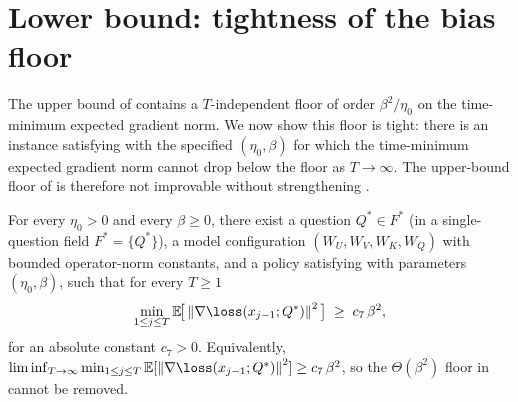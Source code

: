 \section{Lower bound: tightness of the bias floor}
\label{sec:lower_bound}

The upper bound of  contains a
$T$-independent floor of order $\beta^2 / \eta_0$ on the time-minimum
expected gradient norm. We now show this floor is tight: there is an
instance satisfying  with the
specified $(\eta_0, \beta)$ for which the time-minimum expected gradient
norm cannot drop below the floor as $T \to \infty$. The upper-bound
floor of  is therefore not
improvable without strengthening
.

\begin{theorem}\label{thm:lower_bound}
For every $\eta_0 > 0$ and every $\beta \ge 0$, there exist a question
$Q^* \in F^*$ (in a single-question field $F^* = \{Q^*\}$), a model
configuration $(W_U, W_V, W_K, W_Q)$ with bounded operator-norm
constants, and a policy satisfying
with parameters $(\eta_0, \beta)$, such that for every $T \ge 1$
\begin{align}\label{eq:lower_bound_floor}
   \min_{1 \le j \le T} \E\!\bigl[\,\norm{\nabla \loss(x_{j-1}; Q^*)}^2\,\bigr]
   \;\ge\;
   c_7\, \beta^2,
\end{align}
for an absolute constant $c_7 > 0$. Equivalently,
$\liminf_{T \to \infty} \min_{1 \le j \le T} \E[\norm{\nabla \loss(x_{j-1}; Q^*)}^2] \ge c_7\, \beta^2$,
so the $\Theta(\beta^2)$ floor in  cannot be
removed.
\end{theorem}

